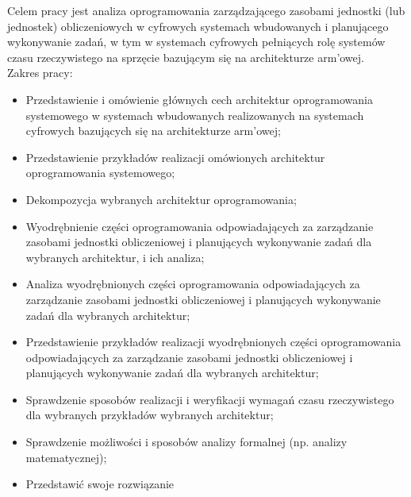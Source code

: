 \documentclass[../../main]{subfiles}
\begin{document}
Celem pracy jest analiza oprogramowania zarządzającego zasobami jednostki (lub jednostek)
obliczeniowych w cyfrowych systemach wbudowanych i planującego wykonywanie zadań, w tym w systemach
cyfrowych pełniących rolę systemów czasu rzeczywistego na sprzęcie bazującym się na architekturze
\acrshort{arm}'owej.\\
Zakres pracy:
\begin{itemize}
    \item Przedstawienie i omówienie głównych cech architektur oprogramowania systemowego w systemach wbudowanych realizowanych na systemach cyfrowych bazujących się na architekturze \acrshort{arm}'owej;
    \item Przedstawienie przykładów realizacji omówionych architektur oprogramowania systemowego;
    \item Dekompozycja wybranych architektur oprogramowania;
    \item Wyodrębnienie części oprogramowania odpowiadających za zarządzanie zasobami jednostki obliczeniowej i planujących wykonywanie zadań dla wybranych architektur, i ich analiza;
    \item Analiza wyodrębnionych części oprogramowania odpowiadających za zarządzanie zasobami jednostki obliczeniowej i planujących wykonywanie zadań dla wybranych architektur;
    \item Przedstawienie przykładów realizacji wyodrębnionych części oprogramowania odpowiadających za zarządzanie zasobami jednostki obliczeniowej i planujących wykonywanie zadań dla wybranych architektur;
    \item Sprawdzenie sposobów realizacji i weryfikacji wymagań czasu rzeczywistego dla wybranych przykładów wybranych architektur;
    \item Sprawdzenie możliwości i sposobów analizy formalnej (np. analizy matematycznej);
    \item Przedstawić swoje rozwiązanie %
\end{itemize}
\end{document}
